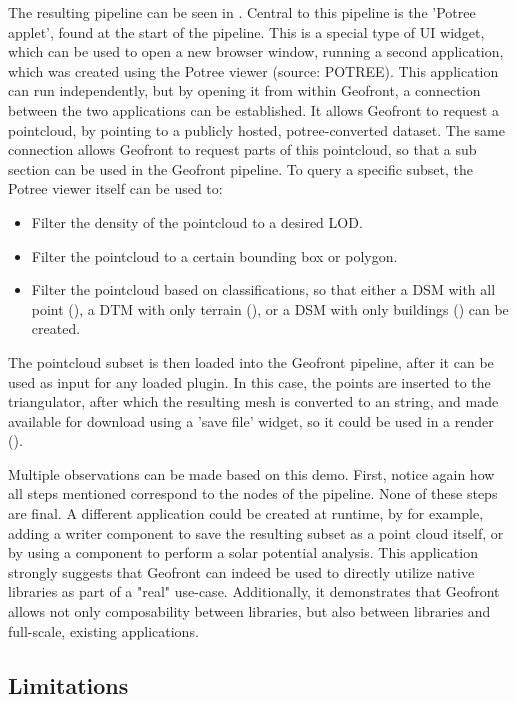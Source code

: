 The resulting pipeline can be seen in . 
Central to this pipeline is the 'Potree applet', found at the start of the pipeline. This is a special type of \ac{UI} widget, which can be used to open a new browser window, running a second application, which was created using the Potree viewer (source: POTREE). 
This application can run independently, but by opening it from within Geofront, a connection between the two applications can be established. 
It allows Geofront to request a pointcloud, by pointing to a publicly hosted, potree-converted dataset. 
The same connection allows Geofront to request parts of this pointcloud, so that a sub section can be used in the Geofront pipeline. 
To query a specific subset, the Potree viewer itself can be used to:
\begin{itemize}
  \item Filter the density of the pointcloud to a desired LOD.
  \item Filter the pointcloud to a certain bounding box or polygon.
  \item Filter the pointcloud based on classifications, so that either 
  a DSM with all point (),
  a DTM with only terrain (), or
  a DSM with only buildings () can be created.
\end{itemize}

The pointcloud subset is then loaded into the Geofront pipeline, after it can be used as input for any loaded plugin. 
In this case, the points are inserted to the  triangulator, after which the resulting mesh is converted to an  string, and made available for download using a 'save file' widget, so it could be used in a render ().


Multiple observations can be made based on this demo.
First, notice again how all steps mentioned correspond to the nodes of the pipeline. 
None of these steps are final. 
A different application could be created at runtime, by for example, adding a  writer component to save the resulting subset as a point cloud itself, or by using a component to perform a solar potential analysis. 
This application strongly suggests that Geofront can indeed be used to directly utilize native libraries as part of a "real" use-case.
Additionally, it demonstrates that Geofront allows not only composability between libraries, but also between libraries and full-scale, existing applications.

\subsection{Limitations}

